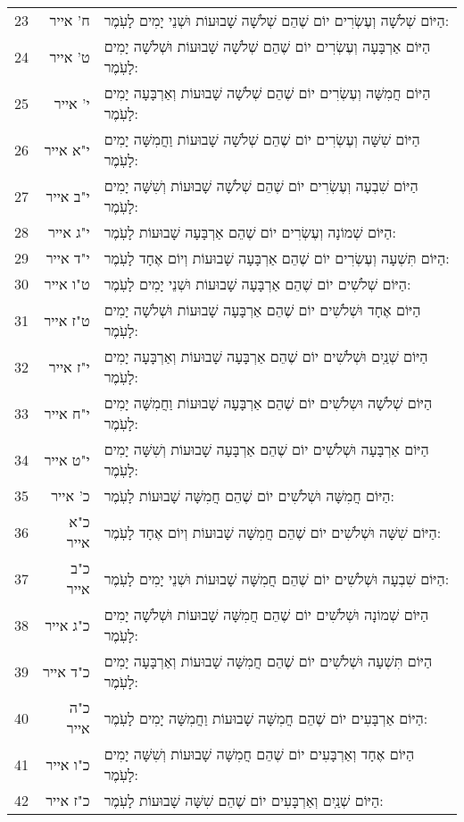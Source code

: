 \documentclass[twoside, openany, parskip=half, 11pt]{book}
\begin{document}
\begin{scriptsize}
\begin{longtable}{ l | r | p{} }
 23 &   ח' אייר &  הַיּוֹם שְׁלֹשָׁה וְעֶשְׂרִים יוֹם שֶׁהֵם שְׁלֹשָׁה שָׁבוּעוֹת וּשְׁנֵי יָמִים לָעֹֽמֶר: \\
 24 &   ט' אייר &  הַיּוֹם אַרְבָּעָה וְעֶשְׂרִים יוֹם שֶׁהֵם שְׁלֹשָׁה שָׁבוּעוֹת וּשְׁלֹשָׁה יָמִים לָעֹֽמֶר: \\
 25 &  י' אייר & הַיּוֹם חֲמִשָּׁה וְעֶשְׂרִים יוֹם שֶׁהֵם שְׁלֹשָׁה שָׁבוּעוֹת וְאַרְבָּעָה יָמִים לָעֹֽמֶר: \\
26 &  י"א אייר & הַיּוֹם שִׁשָּׁה וְעֶשְׂרִים יוֹם שֶׁהֵם שְׁלֹשָׁה שָׁבוּעוֹת וַחֲמִשָּׁה יָמִים לָעֹֽמֶר: \\
 27 &  י"ב אייר &  הַיּוֹם שִׁבְעָה וְעֶשְׂרִים יוֹם שֶׁהֵם שְׁלֹשָׁה שָׁבוּעוֹת וְשִׁשָּׁה יָמִים לָעֹֽמֶר: \\
 28 &  י"ג אייר &  הַיּוֹם שְׁמוֹנָה וְעֶשְׂרִים יוֹם שֶׁהֵם אַרְבָּעָה שָׁבוּעוֹת לָעֹֽמֶר: \\
 29 &  י"ד אייר & הַיּוֹם תִּשְׁעָה וְעֶשְׂרִים יוֹם שֶׁהֵם אַרְבָּעָה שָׁבוּעוֹת וְיוֹם אֶחָד לָעֹֽמֶר: \\
 30 &   ט"ו אייר & הַיּוֹם שְׁלֹשִׁים יוֹם שֶׁהֵם אַרְבָּעָה שָׁבוּעוֹת וּשְׁנֵי יָמִים לָעֹֽמֶר: \\
 31 &  ט"ז אייר &  הַיּוֹם אֶחָד וּשְׁלֹשִׁים יוֹם שֶׁהֵם אַרְבָּעָה שָׁבוּעוֹת וּשְׁלֹשָׁה יָמִים לָעֹֽמֶר: \\
 32 &  י"ז אייר & הַיּוֹם שְׁנַֽיִם וּשְׁלֹשִׁים יוֹם שֶׁהֵם אַרְבָּעָה שָׁבוּעוֹת וְאַרְבָּעָה יָמִים לָעֹֽמֶר: \\
 33 &   י"ח אייר & הַיּוֹם שְׁלֹשָׁה וּשְלֹשִׁים יוֹם שֶׁהֵם אַרְבָּעָה שָׁבוּעוֹת וַחֲמִשָּׁה יָמִים לָעֹֽמֶר: \\
 34 &  י"ט אייר & הַיּוֹם אַרְבָּעָה וּשְׁלֹשִׁים יוֹם שֶׁהֵם אַרְבָּעָה שָׁבוּעוֹת וְשִׁשָּׁה יָמִים לָעֹֽמֶר: \\
 35 &  כ' אייר &  הַיּוֹם חֲמִשָּׁה וּשְׁלֹשִׁים יוֹם שֶׁהֵם חֲמִשָּׁה שָׁבוּעוֹת לָעֹֽמֶר: \\
 36 &  כ"א אייר & הַיּוֹם שִׁשָּׁה וּשְׁלֹשִׁים יוֹם שֶׁהֵם חֲמִשָּׁה שָׁבוּעוֹת וְיוֹם אֶחָד לָעֹֽמֶר: \\
 37 &   כ"ב אייר &  הַיּוֹם שִׁבְעָה וּשְׁלֹשִׁים יוֹם שֶׁהֵם חֲמִשָּׁה שָׁבוּעוֹת וּשְׁנֵי יָמִים לָעֹֽמֶר: \\
 38 &   כ"ג אייר &  הַיּוֹם שְׁמוֹנָה וּשְׁלֹשִׁים יוֹם שֶׁהֵם חֲמִשָּׁה שָׁבוּעוֹת וּשְׁלֹשָׁה יָמִים לָעֹֽמֶר: \\
 39 &   כ"ד אייר & הַיּוֹם תִּשְׁעָה וּשְׁלֹשִׁים יוֹם שֶׁהֵם חֲמִשָּׁה שָׁבוּעוֹת וְאַרְבָּעָה יָמִים לָעֹֽמֶר: \\
 40 &   כ"ה אייר & הַיּוֹם אַרְבָּעִים יוֹם שֶׁהֵם חֲמִשָּׁה שָׁבוּעוֹת וַחֲמִשָּׁה יָמִים לָעֹֽמֶר: \\
 41 &   כ"ו אייר & הַיּוֹם אֶחָד וְאַרְבָּעִים יוֹם שֶׁהֵם חֲמִשָּׁה שָׁבוּעוֹת וְשִׁשָּׁה יָמִים לָעֹֽמֶר: \\
 42 &  כ"ז אייר & הַיּוֹם שְׁנַֽיִם וְאַרְבָּעִים יוֹם שֶׁהֵם שִׁשָּׁה שָׁבוּעוֹת לָעֹֽמֶר: \\

\end{longtable}
\end{scriptsize}
\end{document}
